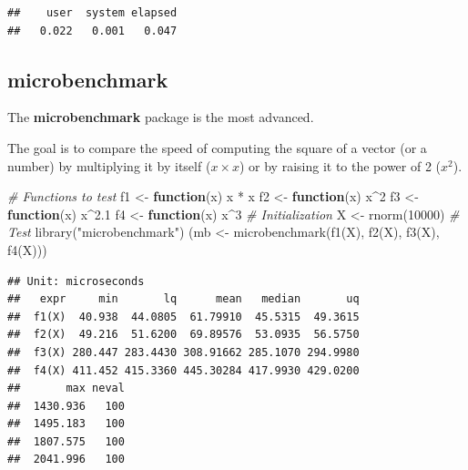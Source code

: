 \documentclass[
  12pt,
  american,
  a4paper,
  extrafontsizes,onecolumn,openright
  ]{memoir}
\newenvironment{Shaded}{\begin{snugshade}}{\end{snugshade}}
\newcommand{\CommentTok}[1]{\textcolor[rgb]{0.56,0.35,0.01}{\textit{#1}}}
\newcommand{\ControlFlowTok}[1]{\textcolor[rgb]{0.13,0.29,0.53}{\textbf{#1}}}
\newcommand{\DecValTok}[1]{\textcolor[rgb]{0.00,0.00,0.81}{#1}}
\newcommand{\FloatTok}[1]{\textcolor[rgb]{0.00,0.00,0.81}{#1}}
\newcommand{\FunctionTok}[1]{\textcolor[rgb]{0.00,0.00,0.00}{#1}}
\newcommand{\NormalTok}[1]{#1}
\newcommand{\OtherTok}[1]{\textcolor[rgb]{0.56,0.35,0.01}{#1}}
\newcommand{\SpecialCharTok}[1]{\textcolor[rgb]{0.00,0.00,0.00}{#1}}
\newcommand{\StringTok}[1]{\textcolor[rgb]{0.31,0.60,0.02}{#1}}
\begin{document}
\begin{verbatim}
##    user  system elapsed 
##   0.022   0.001   0.047
\end{verbatim}

\normalsize

\hypertarget{microbenchmark}{%
\subsection{microbenchmark}\label{microbenchmark}}

The \textbf{microbenchmark} package is the most advanced.

The goal is to compare the speed of computing the square of a vector (or a number) by multiplying it by itself (\(x \times x\)) or by raising it to the power of 2 (\(x^2\)).

\scriptsize

\begin{Shaded}
\begin{Highlighting}[]
\CommentTok{\# Functions to test}
\NormalTok{f1 }\OtherTok{\textless{}{-}} \ControlFlowTok{function}\NormalTok{(x) x }\SpecialCharTok{*}\NormalTok{ x}
\NormalTok{f2 }\OtherTok{\textless{}{-}} \ControlFlowTok{function}\NormalTok{(x) x}\SpecialCharTok{\^{}}\DecValTok{2}
\NormalTok{f3 }\OtherTok{\textless{}{-}} \ControlFlowTok{function}\NormalTok{(x) x}\SpecialCharTok{\^{}}\FloatTok{2.1}
\NormalTok{f4 }\OtherTok{\textless{}{-}} \ControlFlowTok{function}\NormalTok{(x) x}\SpecialCharTok{\^{}}\DecValTok{3}
\CommentTok{\# Initialization}
\NormalTok{X }\OtherTok{\textless{}{-}} \FunctionTok{rnorm}\NormalTok{(}\DecValTok{10000}\NormalTok{)}
\CommentTok{\# Test}
\FunctionTok{library}\NormalTok{(}\StringTok{"microbenchmark"}\NormalTok{)}
\NormalTok{(mb }\OtherTok{\textless{}{-}} \FunctionTok{microbenchmark}\NormalTok{(}\FunctionTok{f1}\NormalTok{(X), }\FunctionTok{f2}\NormalTok{(X), }\FunctionTok{f3}\NormalTok{(X), }\FunctionTok{f4}\NormalTok{(X)))}
\end{Highlighting}
\end{Shaded}

\begin{verbatim}
## Unit: microseconds
##   expr     min       lq      mean   median       uq
##  f1(X)  40.938  44.0805  61.79910  45.5315  49.3615
##  f2(X)  49.216  51.6200  69.89576  53.0935  56.5750
##  f3(X) 280.447 283.4430 308.91662 285.1070 294.9980
##  f4(X) 411.452 415.3360 445.30284 417.9930 429.0200
##       max neval
##  1430.936   100
##  1495.183   100
##  1807.575   100
##  2041.996   100
\end{verbatim}
\end{document}
